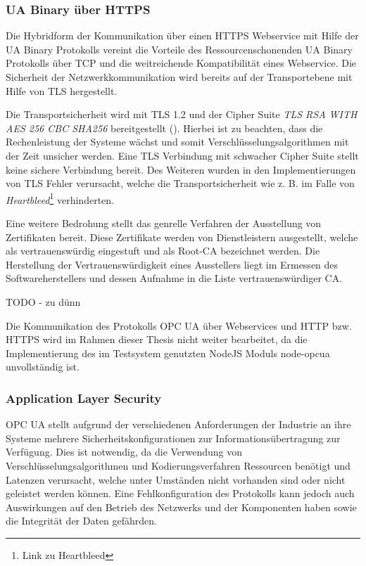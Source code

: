 \subsubsection{\ac{UA} Binary über \ac{HTTPS}}
Die Hybridform der Kommunikation über einen \ac{HTTPS} Webservice mit Hilfe der \ac{UA} Binary Protokolls vereint die Vorteile des Ressourcenschonenden \ac{UA} Binary Protokolls über \ac{TCP} und die weitreichende Kompatibilität eines Webservice. Die Sicherheit der Netzwerkkommunikation wird bereits auf der Transportebene mit Hilfe von \ac{TLS} hergestellt.

Die Transportsicherheit wird mit \ac{TLS} 1.2 und der Cipher Suite \textit{TLS RSA WITH AES 256 CBC SHA256} bereitgestellt (\cite{opcpt7}). Hierbei ist zu beachten, dass die Rechenleistung der Systeme wächst und somit Verschlüsselungsalgorithmen mit der Zeit unsicher werden. Eine \ac{TLS} Verbindung mit schwacher Cipher Suite stellt keine sichere Verbindung bereit. Des Weiteren wurden in den Implementierungen von \ac{TLS} Fehler verursacht, welche die Transportsicherheit wie z. B. im Falle von \textit{Heartbleed}\footnote{Link zu Heartbleed} verhinderten.

Eine weitere Bedrohung stellt das genrelle Verfahren der Ausstellung von Zertifikaten bereit. Diese Zertifikate werden von Dienstleistern ausgestellt, welche als vertrauenswürdig eingestuft und als Root-\ac{CA} bezeichnet werden. Die Herstellung der Vertrauenswürdigkeit eines Ausstellers liegt im Ermessen des Softwareherstellers und dessen Aufnahme in die Liste vertrauenswürdiger \ac{CA}.

TODO - zu dünn

Die Kommunikation des Protokolls \ac{OPC UA} über Webservices und \ac{HTTP} bzw. \ac{HTTPS} wird im Rahmen dieser Thesis nicht weiter bearbeitet, da die Implementierung des im Testsystem genutzten NodeJS Moduls node-opcua unvollständig ist.

\subsubsection{Application Layer Security}
\label{Analyse:Application Layer Security}
\ac{OPC UA} stellt aufgrund der verschiedenen Anforderungen der Industrie an ihre Systeme mehrere Sicherheitskonfigurationen zur Informationsübertragung zur Verfügung. Dies ist notwendig, da die Verwendung von Verschlüsselungsalgorithmen und Kodierungsverfahren Ressourcen benötigt und Latenzen verursacht, welche unter Umständen nicht vorhanden sind oder nicht geleistet werden können. Eine Fehlkonfiguration des Protokolls kann jedoch auch Auswirkungen auf den Betrieb des Netzwerks und der Komponenten haben sowie die Integrität der Daten gefährden.

